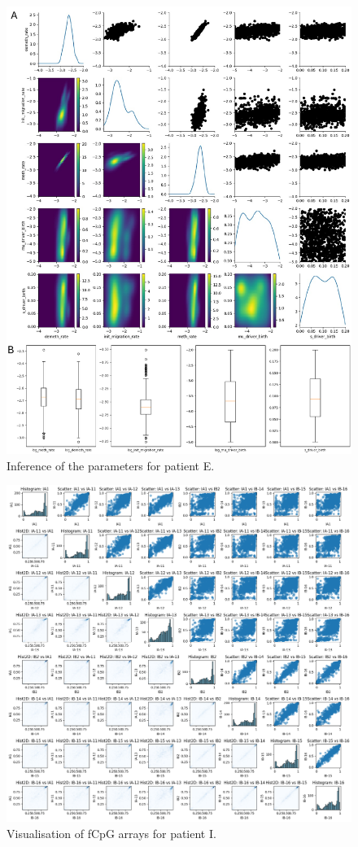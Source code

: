 \begin{figure}[ht]
\centering
\includegraphics[width=\textwidth]{Chapter_5/figures/inference_E.pdf}
\caption{Inference of the parameters for patient E.}
\label{fig:inference_E}
\end{figure}

\begin{figure}[ht]
\centering
\includegraphics[width=\textwidth]{Chapter_5/figures/fCpG_loci_I.png}
\caption{Visualisation of fCpG arrays for patient I.}
\label{fig:vis_I}
\end{figure}

